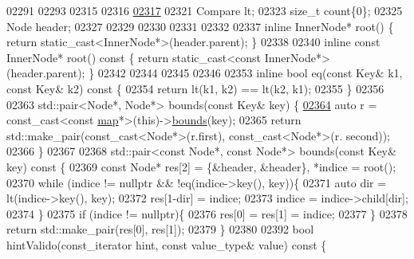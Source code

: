 \begin{DoxyCode}
02291 
02293 
02315 
02316 
\hypertarget{map_8h_source_l02317}{}\hyperlink{classaed2_1_1map_a0e5be36fae0693e4665bd2a615e7550a_a0e5be36fae0693e4665bd2a615e7550a}{02317} 
02321     Compare lt;
02323     \textcolor{keywordtype}{size\_t} count\{0\};
02325     Node header;
02327 
02329 
02330 
02331 
02332 
02337     \textcolor{keyword}{inline} InnerNode* root() \{ \textcolor{keywordflow}{return} \textcolor{keyword}{static\_cast<}InnerNode*\textcolor{keyword}{>}(header.parent); \}
02338 
02340     \textcolor{keyword}{inline} \textcolor{keyword}{const} InnerNode* root()\textcolor{keyword}{ const }\{ \textcolor{keywordflow}{return} \textcolor{keyword}{static\_cast<}\textcolor{keyword}{const }InnerNode*\textcolor{keyword}{>}
      (header.parent); \}
02342 
02344 
02345 
02346 
02353     \textcolor{keyword}{inline} \textcolor{keywordtype}{bool} eq(\textcolor{keyword}{const} Key& k1, \textcolor{keyword}{const} Key& k2)\textcolor{keyword}{ const }\{
02354         \textcolor{keywordflow}{return} lt(k1, k2) == lt(k2, k1);
02355     \}
02356 
02363     std::pair<Node*, Node*> bounds(\textcolor{keyword}{const} Key& key) \{
\hypertarget{map_8h_source_l02364}{}\hyperlink{classaed2_1_1map_a4d903414b3f1f1e6f785342bb3900572_a4d903414b3f1f1e6f785342bb3900572}{02364}         \textcolor{keyword}{auto} r = \textcolor{keyword}{const\_cast<}\textcolor{keyword}{const }\hyperlink{classaed2_1_1map}{map}*\textcolor{keyword}{>}(\textcolor{keyword}{this})->\hyperlink{classaed2_1_1map_a4d903414b3f1f1e6f785342bb3900572_a4d903414b3f1f1e6f785342bb3900572}{bounds}(key);
02365         \textcolor{keywordflow}{return} std::make\_pair(const\_cast<Node*>(r.first), const\_cast<Node*>(r.
      second));
02366     \}
02367 
02368     std::pair<const Node*, const Node*> bounds(\textcolor{keyword}{const} Key& key)\textcolor{keyword}{ const }\{
02369         \textcolor{keyword}{const} Node* res[2] = \{&header, &header\}, *indice = root();
02370         \textcolor{keywordflow}{while} (indice != \textcolor{keyword}{nullptr} && !eq(indice->key(), key))\{
02371             \textcolor{keyword}{auto} dir = lt(indice->key(), key);
02372             res[1-dir] = indice;
02373             indice = indice->child[dir];
02374         \}
02375         \textcolor{keywordflow}{if} (indice != \textcolor{keyword}{nullptr})\{
02376             res[0] = res[1] = indice;
02377         \}
02378         \textcolor{keywordflow}{return} std::make\_pair(res[0], res[1]);
02379     \}
02380 
02392     \textcolor{keywordtype}{bool} hintValido(const\_iterator hint, \textcolor{keyword}{const} value\_type& value)\textcolor{keyword}{ const }\{

\end{DoxyCode}
